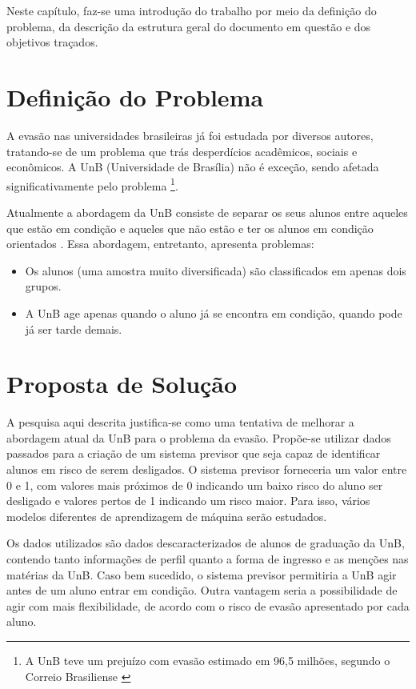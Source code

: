 Neste capítulo, faz-se uma introdução do trabalho por meio da definição do problema,
da descrição da estrutura geral do documento em questão e dos objetivos traçados.

\section{Definição do Problema}
A evasão nas universidades brasileiras já foi estudada por diversos autores,
tratando-se de um problema que trás desperdícios acadêmicos, sociais e econômicos.
A UnB (Universidade de Brasília) não é exceção, sendo afetada significativamente pelo
problema \footnote{A UnB teve um prejuízo com evasão estimado em 96,5 milhões,
segundo o Correio Brasiliense \cite{correio}}.

\par Atualmente a abordagem da UnB consiste de separar os seus alunos entre aqueles
que estão em condição e aqueles que não estão e ter os alunos em condição orientados
\cite{manual_calouro}. Essa abordagem, entretanto, apresenta problemas:
\begin{itemize}
    \item Os alunos (uma amostra muito diversificada) são classificados em apenas
dois grupos.
    \item A UnB age apenas quando o aluno já se encontra em condição, quando pode
já ser tarde demais.
\end{itemize}

\section{Proposta de Solução}
A pesquisa aqui descrita justifica-se como uma tentativa de melhorar a abordagem
atual da UnB para o problema da evasão. Propõe-se utilizar dados passados para
a criação de um sistema previsor que seja capaz de identificar alunos em risco de
serem desligados. O sistema previsor forneceria um valor entre 0 e 1, com valores
mais próximos de 0 indicando um baixo risco do aluno ser desligado e valores pertos de
1 indicando um risco maior. Para isso, vários modelos diferentes de aprendizagem de máquina
serão estudados. 
\par Os dados utilizados são dados descaracterizados de alunos de
graduação da UnB, contendo tanto informações de perfil quanto a forma de ingresso e
as menções nas matérias da UnB. Caso bem sucedido, o sistema previsor permitiria a
UnB agir antes de um aluno entrar em condição. Outra vantagem seria a possibilidade
de agir com mais flexibilidade, de acordo com o risco de evasão apresentado por cada
aluno.


